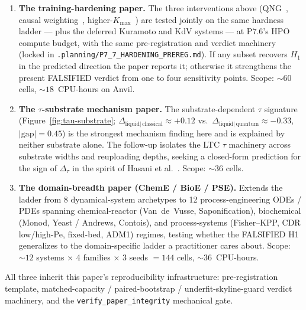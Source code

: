 \begin{enumerate}
  \item \textbf{The training-hardening paper.} The three
        interventions above (QNG~\cite{stokes2020quantum}, causal
        weighting~\cite{wang2022causality},
        higher-$K_{\max}$~\cite{schuld2021effect}) are tested
        jointly on the same hardness ladder --- plus the deferred
        Kuramoto and KdV systems --- at P7.6's HPO compute budget,
        with the same
        pre-registration and verdict machinery (locked in
        \texttt{.planning/P7\_7\_HARDENING\_PREREG.md}). If any
        subset recovers $H_1$ in the predicted direction the
        paper reports it; otherwise it strengthens the present
        FALSIFIED verdict from one to four sensitivity points.
        Scope: $\sim 60$ cells, $\sim 18$~CPU-hours on Anvil.

  \item \textbf{The $\tau$-substrate mechanism paper.} The
        substrate-dependent $\tau$ signature
        (Figure~\ref{fig:tau-substrate}; $\Delta_{\mathrm{liquid}|\,
        \mathrm{classical}} \approx +0.12$ vs.\
        $\Delta_{\mathrm{liquid}|\,\mathrm{quantum}} \approx -0.33$,
        $|\textrm{gap}| = 0.45$) is the strongest mechanism finding
        here and is explained by neither substrate alone. The
        follow-up isolates the LTC $\tau$ machinery across substrate
        widths and reuploading depths, seeking a closed-form
        prediction for the sign of $\Delta_\tau$ in the spirit of
        Hasani et al.~\cite{hasani2022closed}. Scope: $\sim 36$
        cells.

  \item \textbf{The domain-breadth paper (ChemE / BioE / PSE).}
        Extends the ladder from 8 dynamical-system archetypes to 12
        process-engineering ODEs / PDEs spanning chemical-reactor
        (Van~de~Vusse, Saponification), biochemical (Monod,
        Yeast / Andrews, Contois), and process-systems
        (Fisher--KPP, CDR low/high-Pe, fixed-bed, ADM1) regimes,
        testing whether the FALSIFIED H1 generalizes to the
        domain-specific ladder a practitioner cares about. Scope:
        $\sim 12$ systems $\times$ 4 families $\times$ 3 seeds
        $= 144$ cells, $\sim 36$~CPU-hours.
\end{enumerate}

All three inherit this paper's reproducibility infrastructure:
pre-registration template, matched-capacity / paired-bootstrap /
underfit-skyline-guard verdict machinery, and the
\texttt{verify\_paper\_integrity} mechanical gate.

